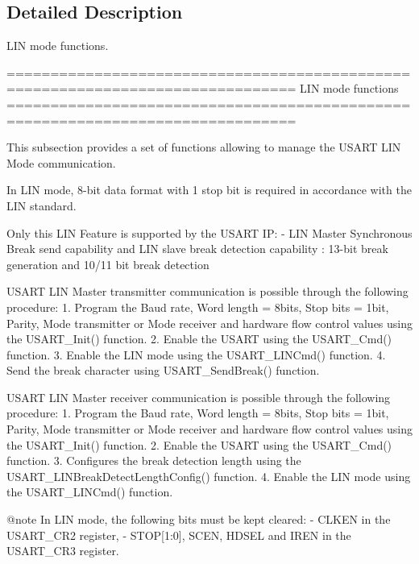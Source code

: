 \subsection{Detailed Description}
L\-I\-N mode functions. \begin{DoxyVerb} ===============================================================================
                                LIN mode functions
 ===============================================================================  

  This subsection provides a set of functions allowing to manage the USART LIN 
  Mode communication.
  
  In LIN mode, 8-bit data format with 1 stop bit is required in accordance with 
  the LIN standard.

  Only this LIN Feature is supported by the USART IP:
    - LIN Master Synchronous Break send capability and LIN slave break detection
      capability :  13-bit break generation and 10/11 bit break detection


  USART LIN Master transmitter communication is possible through the following procedure:
     1. Program the Baud rate, Word length = 8bits, Stop bits = 1bit, Parity, 
        Mode transmitter or Mode receiver and hardware flow control values using 
        the USART_Init() function.
     2. Enable the USART using the USART_Cmd() function.
     3. Enable the LIN mode using the USART_LINCmd() function.
     4. Send the break character using USART_SendBreak() function.

  USART LIN Master receiver communication is possible through the following procedure:
     1. Program the Baud rate, Word length = 8bits, Stop bits = 1bit, Parity, 
        Mode transmitter or Mode receiver and hardware flow control values using 
        the USART_Init() function.
     2. Enable the USART using the USART_Cmd() function.
     3. Configures the break detection length using the USART_LINBreakDetectLengthConfig()
        function.
     4. Enable the LIN mode using the USART_LINCmd() function.


@note In LIN mode, the following bits must be kept cleared:
        - CLKEN in the USART_CR2 register,
        - STOP[1:0], SCEN, HDSEL and IREN in the USART_CR3 register.\end{DoxyVerb}
 

